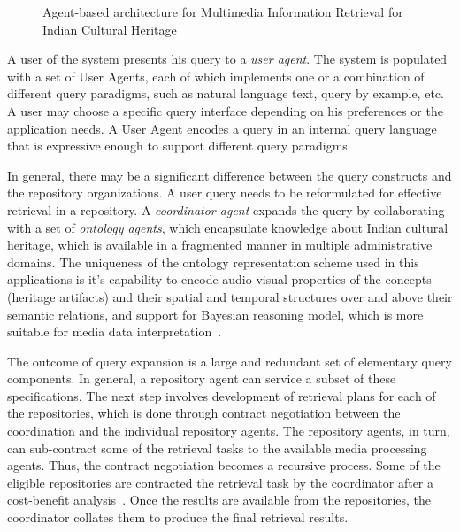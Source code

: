 \begin{figure}[htpb!]
	\centering
\caption{Agent-based architecture for Multimedia Information Retrieval for Indian Cultural Heritage}
\label{fig:agents:heritage}
\end{figure}

A user of the system presents his query to a {\em user agent}. The system is populated with a set of User Agents, each of which
implements one or a combination of different query paradigms, such as natural language text, query by example, etc. A user may
choose a specific query interface depending on his preferences or the application needs. A User Agent encodes a query in an 
internal query language that is expressive enough to support different query paradigms. 

In general, there may be a significant difference between the query constructs and the repository organizations. A user query 
needs to be reformulated for effective retrieval in a repository. A {\em coordinator agent} expands the query by collaborating 
with a set of {\em ontology agents}, which encapsulate knowledge about Indian cultural heritage, which is available in a fragmented 
manner in multiple administrative domains. The uniqueness of the ontology representation scheme used in this 
applications is it's capability to encode audio-visual properties of the concepts (heritage artifacts) and their spatial and temporal
structures over and above their semantic relations, and support for Bayesian reasoning model, which is more suitable for media
data interpretation~\citep{Chaudhury:2015}. 

The outcome of query expansion is a large and redundant set of elementary query components. In general, a repository agent
can service a subset of these specifications. The next step involves development of retrieval plans for each of the repositories, 
which is done through contract negotiation between the coordination and the individual repository agents. The repository agents,
in turn, can sub-contract some of the retrieval tasks to the available media processing agents. Thus, the contract negotiation
becomes a recursive process. Some of the eligible repositories are contracted the retrieval task by the coordinator after a 
cost-benefit analysis~\citep{Ghosh:2004}. Once the results are available from the repositories, the coordinator collates
them to produce the final retrieval results.

